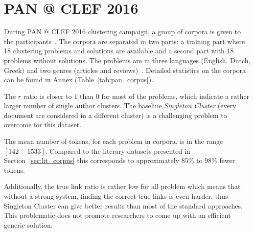 \section{PAN @ CLEF 2016}

During PAN @ CLEF 2016 clustering campaign, a group of corpora is given to the participants~\cite{pan16_corpus}.
The corpora are separated in two parts: a training part where 18 clustering problems and solutions are available and a second part with 18 problems without solutions.
The problems are in three languages (English, Dutch, Greek) and two genres (articles and reviews)~\cite{pan16}.
Detailed statistics on the corpora can be found in Annex (Table~\ref{tab:pan_corpus}).

The $r$ ratio is closer to $1$ than $0$ for most of the problems, which indicate a rather larger number of single author clusters.
The baseline \textit{Singleton Cluster} (every document are considered in a different cluster) is a challenging problem to overcome for this dataset.

The mean number of tokens, for each problem in corpora, is in the range $[142-1533]$.
Compared to the literary datasets presented in Section~\ref{sec:lit_corpus} this corresponds to approximately 85\% to 98\% fewer tokens.

Additionally, the true link ratio is rather low for all problem which means that without a strong system, finding the correct true links is even harder, thus Singleton Cluster can give better results than most of the standard approaches.
This problematic does not promote researchers to come up with an efficient generic solution.
